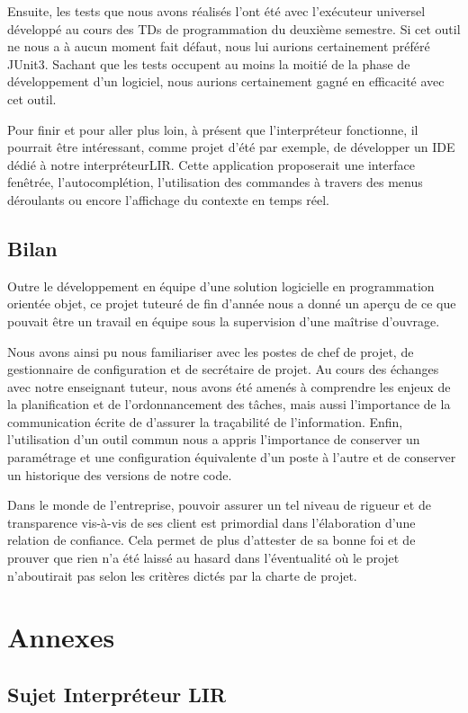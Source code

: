 \documentclass[12pt,a4paper,titlepage,openany, oneside]{report}
\begin{document}
        Ensuite, les tests que nous avons réalisés l'ont été avec l'exécuteur universel
        développé au cours des TDs de programmation du deuxième semestre. Si cet outil
        ne nous a à aucun moment fait défaut, nous lui aurions certainement préféré JUnit3.
        Sachant que les tests occupent au moins la moitié de la phase de développement d'un
        logiciel, nous aurions certainement gagné en efficacité avec cet outil.

        Pour finir et pour aller plus loin, à présent que l'interpréteur fonctionne, il
        pourrait être intéressant, comme projet d'été par exemple, de développer un
        IDE dédié à notre interpréteurLIR. Cette application proposerait une interface
        fenêtrée, l'autocomplétion, l'utilisation des commandes à travers des
        menus déroulants ou encore l'affichage du contexte en temps réel.


    \chapter{Bilan}
        \large
        Outre le développement en équipe d'une solution logicielle en programmation
        orientée objet, ce projet tuteuré de fin d'année nous a donné un aperçu de ce que
        pouvait être un travail en équipe sous la supervision d'une maîtrise d'ouvrage.

        Nous avons ainsi pu nous familiariser avec les postes de chef de projet, de
        gestionnaire de configuration et de secrétaire de projet. Au cours des échanges
        avec notre enseignant tuteur, nous avons été amenés à comprendre les enjeux
        de la planification et de l'ordonnancement des tâches, mais aussi l'importance de
        la communication écrite de d'assurer la traçabilité de l'information. Enfin,
        l'utilisation d'un outil commun nous a appris l'importance de conserver un
        paramétrage et une configuration équivalente d'un poste à l'autre et de conserver
        un historique des versions de notre code.

        Dans le monde de l'entreprise, pouvoir assurer un tel niveau de rigueur et de
        transparence vis-à-vis de ses client est primordial dans l'élaboration d'une
        relation de confiance. Cela permet de plus d'attester de sa bonne foi et de
        prouver que rien n'a été laissé au hasard dans l'éventualité où le projet
        n'aboutirait pas selon les critères dictés par la charte de projet.

        \normalsize
    \part{Annexes}

    \appendix
    \chapter{Sujet Interpréteur LIR}

    
\end{document}
